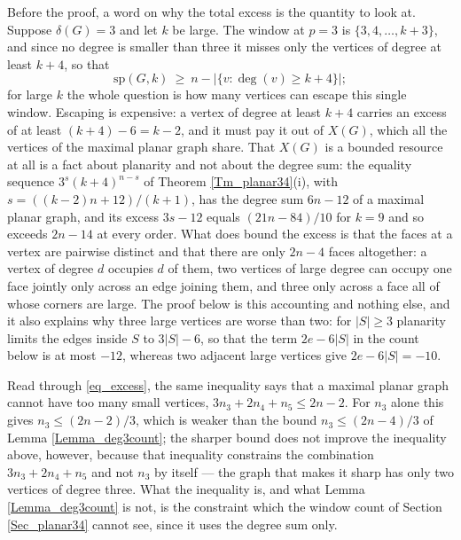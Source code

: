 \documentclass[12pt,a4paper]{article}%
\begin{document}
Before the proof, a word on why the total excess is the quantity to look at. Suppose
$\delta (G)=3$ and let $k$ be large. The window at $p=3$ is $\{3,4,\ldots ,k+3\}$, and since no
degree is smaller than three it misses only the vertices of degree at least $k+4$, so that
\[
\mathrm{sp}(G,k)\ \geq \ n-\left\vert \{v:\deg (v)\geq k+4\}\right\vert ;
\]
for large $k$ the whole question is how many vertices can escape this single window. Escaping is
expensive: a vertex of degree at least $k+4$ carries an excess of at least $(k+4)-6=k-2$, and it
must pay it out of $X(G)$, which all the vertices of the maximal planar graph share. That $X(G)$ is a
bounded resource at all is a fact about planarity and not about the degree sum: the equality
sequence $3^{s}(k+4)^{n-s}$ of Theorem \ref{Tm_planar34}(i), with $s=((k-2)n+12)/(k+1)$, has the
degree sum $6n-12$ of a maximal planar graph, and its excess $3s-12$ equals $(21n-84)/10$ for $k=9$ and so
exceeds $2n-14$ at every order.
What does bound the excess is that the faces at a vertex are pairwise distinct and that there are
only $2n-4$ faces altogether: a vertex of degree $d$ occupies $d$ of them, two vertices of large
degree can occupy one face jointly only across an edge joining them, and three only across a face
all of whose corners are large. The proof below is this accounting and nothing else, and it also
explains why three large vertices are worse than two: for $|S|\geq 3$ planarity limits the edges
inside $S$ to $3|S|-6$, so that the term $2e-6|S|$ in the count below is at most $-12$, whereas
two adjacent large vertices give $2e-6|S|=-10$.

Read through \eqref{eq_excess}, the same inequality says that a maximal planar graph cannot have too many
small vertices, $3n_{3}+2n_{4}+n_{5}\leq 2n-2$. For $n_{3}$ alone this gives $n_{3}\leq (2n-2)/3$, which
is weaker than the bound $n_{3}\leq (2n-4)/3$ of Lemma \ref{Lemma_deg3count}; the sharper bound does not
improve the inequality above, however, because that inequality constrains the combination
$3n_{3}+2n_{4}+n_{5}$ and not $n_{3}$ by itself --- the graph that makes it sharp has only two vertices of
degree three. What the inequality is, and what Lemma \ref{Lemma_deg3count} is not, is the
constraint which the window count of Section \ref{Sec_planar34} cannot see, since it uses the degree
sum only.


\end{document}
